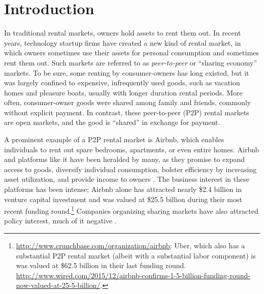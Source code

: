 \documentclass[11pt]{article}
\begin{document}

\section{Introduction}
In traditional rental markets, owners hold assets to rent them out.
In recent years, technology startup firms have created a new kind of rental market, in which owners sometimes use their assets for personal consumption and sometimes rent them out.
Such markets are referred to as \emph{peer-to-peer} or ``sharing economy'' markets.  
To be sure, some renting by consumer-owners has long existed, but it was largely confined to expensive, infrequently used goods, such as vacation homes and pleasure boats, usually with longer duration rental periods.
More often, consumer-owner goods were shared among family and friends, commonly without explicit payment.
In contrast, these peer-to-peer (P2P) rental markets are open markets, and the good is ``shared'' in exchange for payment. 

A prominent example of a P2P rental market is Airbnb, which enables individuals to rent out spare bedrooms, apartments, or even entire homes. 
Airbnb and platforms like it have been heralded by many, as they promise to expand access to goods, diversify individual consumption, bolster efficiency by increasing asset utilization, and provide income to owners \citep{sundararajan2013zipcar, edelman2015efficiencies, botsman2010s}.
The business interest in these platforms has been intense; Airbnb alone has attracted nearly \$2.4 billion in venture capital investment and was valued at \$25.5 billion during their most recent funding round.\footnote{\href{http://www.crunchbase.com/organization/airbnb}{http://www.crunchbase.com/organization/airbnb};
  Uber, which also has a substantial P2P rental market (albeit with a substantial labor component) is was valued at \$62.5 billion in their last funding round. 
  \href{http://www.wired.com/2015/12/airbnb-confirms-1-5-billion-funding-round-now-valued-at-25-5-billion/}{http://www.wired.com/2015/12/airbnb-confirms-1-5-billion-funding-round-now-valued-at-25-5-billion/}. 
}
Companies organizing sharing markets have also attracted policy interest, much of it negative \citep{slee2015, malhotra2014dark, avital2015}.
\end{document}

